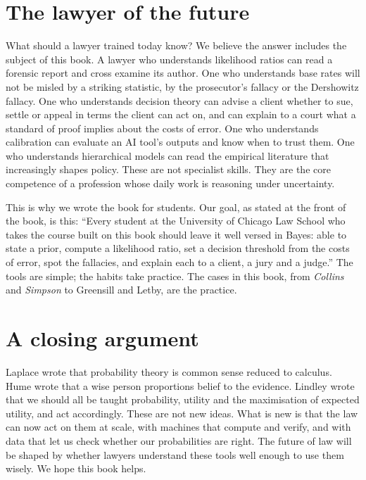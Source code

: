 \section{The lawyer of the future}

What should a lawyer trained today know? We believe the answer includes the subject of this book. A lawyer who understands likelihood ratios can read a forensic report and cross examine its author. One who understands base rates will not be misled by a striking statistic, by the prosecutor's fallacy or the Dershowitz fallacy. One who understands decision theory can advise a client whether to sue, settle or appeal in terms the client can act on, and can explain to a court what a standard of proof implies about the costs of error. One who understands calibration can evaluate an AI tool's outputs and know when to trust them. One who understands hierarchical models can read the empirical literature that increasingly shapes policy. These are not specialist skills. They are the core competence of a profession whose daily work is reasoning under uncertainty.

This is why we wrote the book for students. Our goal, as stated at the front of the book, is this: ``Every student at the University of Chicago Law School who takes the course built on this book should leave it well versed in Bayes: able to state a prior, compute a likelihood ratio, set a decision threshold from the costs of error, spot the fallacies, and explain each to a client, a jury and a judge.'' The tools are simple; the habits take practice. The cases in this book, from \emph{Collins} and \emph{Simpson} to Greensill and Letby, are the practice.

\section{A closing argument}

Laplace wrote that probability theory is common sense reduced to calculus. Hume wrote that a wise person proportions belief to the evidence. Lindley wrote that we should all be taught probability, utility and the maximisation of expected utility, and act accordingly. These are not new ideas. What is new is that the law can now act on them at scale, with machines that compute and verify, and with data that let us check whether our probabilities are right. The future of law will be shaped by whether lawyers understand these tools well enough to use them wisely. We hope this book helps.

